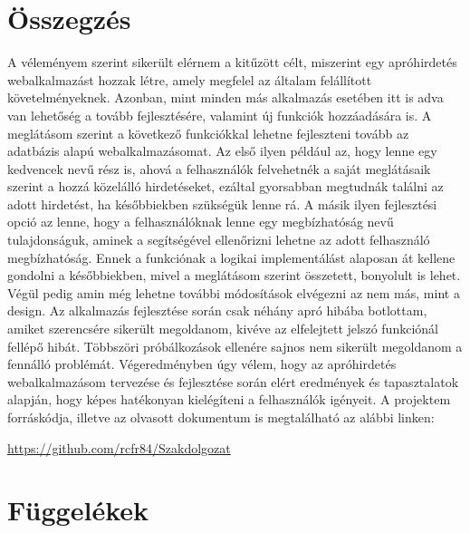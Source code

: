 \documentclass[]{thesis-ekf}
\theoremstyle{definition}
\theoremstyle{remark}
\begin{document}
	\chapter*{Összegzés}
		A véleményem szerint sikerült elérnem a kitűzött célt, miszerint egy apróhirdetés webalkalmazást hozzak létre, amely megfelel az általam felállított követelményeknek. Azonban, mint minden más alkalmazás esetében itt is adva van lehetőség a tovább fejlesztésére, valamint új funkciók hozzáadására is. A meglátásom szerint a következő funkciókkal lehetne fejleszteni tovább az adatbázis alapú webalkalmazásomat. Az első ilyen például az, hogy lenne egy kedvencek nevű rész is, ahová a felhasználók felvehetnék a saját meglátásaik szerint a hozzá közelálló hirdetéseket, ezáltal gyorsabban megtudnák találni az adott hirdetést, ha későbbiekben szükségük lenne rá. A másik ilyen fejlesztési opció az lenne, hogy a felhasználóknak lenne egy megbízhatóság nevű tulajdonságuk, aminek a segítségével ellenőrizni lehetne az adott felhasználó megbízhatóság. Ennek a funkciónak a logikai implementálást alaposan át kellene gondolni a későbbiekben, mivel a meglátásom szerint összetett, bonyolult is lehet. Végül pedig amin még lehetne további módosítások elvégezni az nem más, mint a design. Az alkalmazás fejlesztése során csak néhány apró hibába botlottam, amiket szerencsére sikerült megoldanom, kivéve az elfelejtett jelszó funkciónál fellépő hibát. Többszöri próbálkozások ellenére sajnos nem sikerült megoldanom a fennálló problémát. Végeredményben úgy vélem, hogy az apróhirdetés webalkalmazásom tervezése és fejlesztése során elért eredmények és tapasztalatok alapján, hogy képes hatékonyan kielégíteni a felhasználók igényeit. A projektem forráskódja, illetve az olvasott dokumentum is megtalálható az alábbi linken:
		\begin{center}
			\url{https://github.com/rcfr84/Szakdolgozat}
		\end{center}
		
	\chapter*{Függelékek}\label{ch-fugg}
\end{document}
